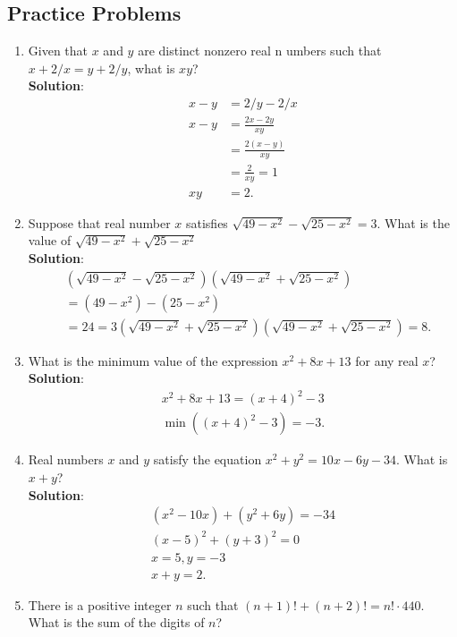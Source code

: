 \subsection{Practice Problems}
\begin{enumerate}
  \item Given that $x$ and $y$ are distinct nonzero real n umbers such that $x+2/x=y+2/y$, what is $xy$?
  \\ \textbf{Solution}: 
  \begin{align*}
    x - y &= 2/y - 2/x \\
    x - y &= \frac{2x - 2y}{xy} \\
    &= \frac{2(x-y)}{xy} \\
    &= \frac{2}{xy} = 1 \\
    xy &= \boxed{2}.
  \end{align*}
  \item Suppose that real number $x$ satisfies $\sqrt{49-x^2} - \sqrt{25 - x^2} = 3$. What is the value of $\sqrt{49-x^2} + \sqrt{25 - x^2}$
  \\ \textbf{Solution}:
  \begin{align*}
    &(\sqrt{49-x^2} - \sqrt{25 - x^2})(\sqrt{49-x^2} + \sqrt{25 - x^2}) \\
    &= (49-x^2) - (25 - x^2) \\
    &= 24 = 3(\sqrt{49-x^2} + \sqrt{25 - x^2})
    (\sqrt{49-x^2} + \sqrt{25 - x^2}) = \boxed{8}.
  \end{align*}
  \item What is the minimum value of the expression $x^2 + 8x + 13$ for any real $x$?
  \\ \textbf{Solution}:
  \begin{align*}
    x^2 + 8x + 13 = (x + 4)^2 - 3 \\
    \min((x + 4)^2 - 3) = \boxed{-3}.
  \end{align*}
  \item Real numbers $x$ and $y$ satisfy the equation $x^2+y^2=10x-6y-34$. What is $x+y$?
  \\ \textbf{Solution}:
  \begin{align*}
    (x^2-10x) + (y^2+6y) = -34 \\
    (x-5)^2+(y+3)^2 = 0 \\
    x = 5, y = -3 \\
    x+y = \boxed{2}.
  \end{align*}
  \item There is a positive integer $n$ such that $(n+1)!+(n+2)! = n!\cdot 440$. What is the sum of the digits of $n$?

\end{enumerate}
